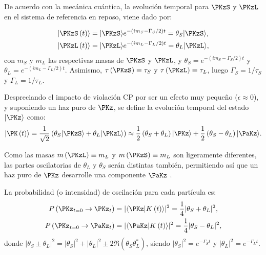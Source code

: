 De acuerdo con la mecánica cuántica, la evolución temporal para $\PKzS$ y $\PKzL$ en el sistema de referencia en reposo, viene dado por:

\begin{align}
|\PKzS\left(t\right)\rangle &= |\PKzS\rangle e^{-\left(im_{S}-\Gamma_{S}/2\right)t} = \theta_{S}|\PKzS\rangle , \\
|\PKzL\left(t\right)\rangle &= |\PKzL\rangle e^{-\left(im_{L}-\Gamma_{L}/2\right)t} = \theta_{L}|\PKzL\rangle , \label{eq:evtempKSKL}
\end{align}
con $m_{S}$ y $m_{L}$ las respectivas masas de $\PKzS$ y $\PKzL$, y $\theta_{S}=e^{-\left(im_{S}-\Gamma_{S}/2\right)t}$ y $\theta_{L}=e^{-\left(im_{L}-\Gamma_{L}/2\right)t}$. Asimismo, $\tau\left(\PKzS\right) \equiv \tau_S$ y $\tau\left(\PKzL\right) \equiv \tau_L$, luego $\Gamma_{S}=1/ \tau_S$ y $\Gamma_{L}=1/\tau_L$. 

Despreciando el impacto de violación CP por ser un efecto muy pequeño ($\epsilon \approx 0$), y suponiendo un haz puro de $\PKz$, se define la evolución temporal del estado $|\PKz\rangle$ como:
\begin{equation}
|\PK\left(t\right)\rangle=\dfrac{1}{\sqrt{2}}\left(\theta_{S}|\PKzS\rangle + \theta_{L}|\PKzL\rangle \right) \approx \dfrac{1}{2}\left(\theta_{S}+\theta_{L}\right)|\PKz\rangle + \dfrac{1}{2}\left(\theta_{S}-\theta_{L}\right)|\PaKz\rangle .
\end{equation}

Como las masas $m\left(\PKzL\right) \equiv m_{L}$ y $m\left(\PKzS\right) \equiv m_{L}$ son ligeramente diferentes, las partes oscilatorias de $\theta_{L}$ y $\theta_{S}$ serán distintas también, permitiendo así que un haz puro de $\PKz$ desarrolle una componente $\PaKz$ \cite{Thomson}.

La probabilidad (o intensidad) de oscilación para cada partícula es:
\begin{align}
P\left(\PKz_{t=0} \rightarrow \PKz_{t}\right)&= |\langle\PKz|K\left(t\right)\rangle|^2 =\dfrac{1}{4}|\theta_{S}+\theta_{L}|^2 ,\label{eq:prob1osci}\\
P\left(\PKz_{t=0} \rightarrow \PaKz_{t}\right)&= |\langle\PaKz|K\left(t\right)\rangle|^2 =\dfrac{1}{4}|\theta_{S}-\theta_{L}|^2 ,\label{eq:prob2osci}
\end{align}
donde $|\theta_{S} \pm \theta_{L}|^2=|\theta_{S}|^2+|\theta_{L}|^2 \pm 2\Re\left(\theta_{S}\theta_{L}^{\ast}\right)$, siendo $|\theta_{S}|^2=e^{-\Gamma_{S} t}$ y $|\theta_{L}|^2=e^{-\Gamma_{L} t}$. 

